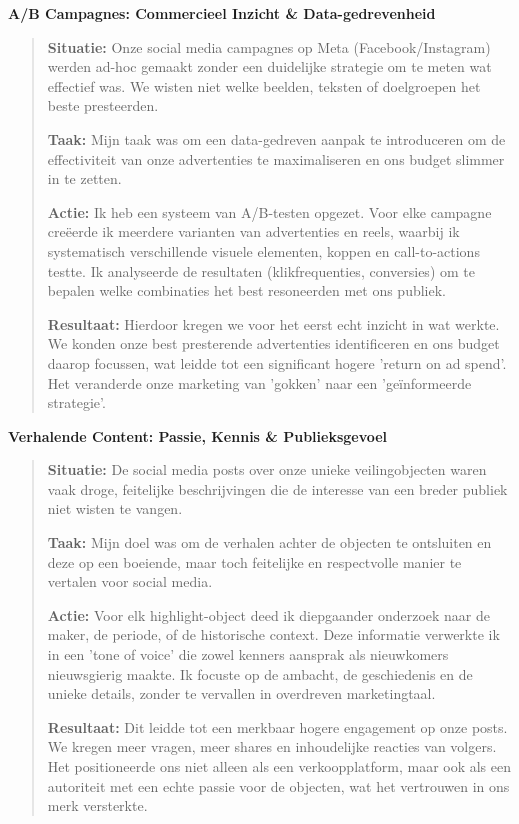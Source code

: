 \documentclass[11pt,a4paper]{article}
\newcommand{\starsubsection}[2]{
    \textbf{\color{accentgray}#1:} #2
    \vspace{0.3em}
}
\newenvironment{starexample}[1]{
    \vspace{1em}
    {\large\sffamily\bfseries\color{primaryblue}#1}
    \vspace{0.5em}
    \begin{quote}
}{
    \end{quote}
    \vspace{0.5em}
}
\begin{document}
\begin{starexample}{A/B Campagnes: Commercieel Inzicht \& Data-gedrevenheid}

\starsubsection{Situatie}{Onze social media campagnes op Meta (Facebook/Instagram) werden ad-hoc gemaakt zonder een duidelijke strategie om te meten wat effectief was. We wisten niet welke beelden, teksten of doelgroepen het beste presteerden.}

\starsubsection{Taak}{Mijn taak was om een data-gedreven aanpak te introduceren om de effectiviteit van onze advertenties te maximaliseren en ons budget slimmer in te zetten.}

\starsubsection{Actie}{Ik heb een systeem van A/B-testen opgezet. Voor elke campagne creëerde ik meerdere varianten van advertenties en reels, waarbij ik systematisch verschillende visuele elementen, koppen en call-to-actions testte. Ik analyseerde de resultaten (klikfrequenties, conversies) om te bepalen welke combinaties het best resoneerden met ons publiek.}

\starsubsection{Resultaat}{Hierdoor kregen we voor het eerst echt inzicht in wat werkte. We konden onze best presterende advertenties identificeren en ons budget daarop focussen, wat leidde tot een significant hogere 'return on ad spend'. Het veranderde onze marketing van 'gokken' naar een 'geïnformeerde strategie'.}

\end{starexample}

\begin{starexample}{Verhalende Content: Passie, Kennis \& Publieksgevoel}

\starsubsection{Situatie}{De social media posts over onze unieke veilingobjecten waren vaak droge, feitelijke beschrijvingen die de interesse van een breder publiek niet wisten te vangen.}

\starsubsection{Taak}{Mijn doel was om de verhalen achter de objecten te ontsluiten en deze op een boeiende, maar toch feitelijke en respectvolle manier te vertalen voor social media.}

\starsubsection{Actie}{Voor elk highlight-object deed ik diepgaander onderzoek naar de maker, de periode, of de historische context. Deze informatie verwerkte ik in een 'tone of voice' die zowel kenners aansprak als nieuwkomers nieuwsgierig maakte. Ik focuste op de ambacht, de geschiedenis en de unieke details, zonder te vervallen in overdreven marketingtaal.}

\starsubsection{Resultaat}{Dit leidde tot een merkbaar hogere engagement op onze posts. We kregen meer vragen, meer shares en inhoudelijke reacties van volgers. Het positioneerde ons niet alleen als een verkoopplatform, maar ook als een autoriteit met een echte passie voor de objecten, wat het vertrouwen in ons merk versterkte.}

\end{starexample}
\end{document}
